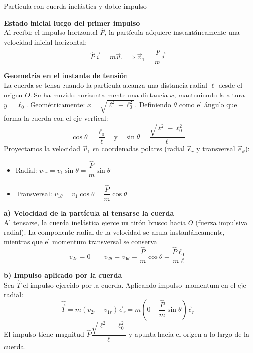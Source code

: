 \begin{solucion}{Partícula con cuerda inelástica y doble impulso}

\textbf{Estado inicial luego del primer impulso}\\
Al recibir el impulso horizontal $\hat{P}$, la partícula adquiere instantáneamente una velocidad inicial horizontal:
$$\hat{P}\,\vec{i} = m\vec{v}_1 \implies \vec{v}_1 = \frac{\hat{P}}{m}\vec{i}$$

\textbf{Geometría en el instante de tensión}\\
La cuerda se tensa cuando la partícula alcanza una distancia radial $\ell$ desde el origen $O$. Se ha movido horizontalmente una distancia $x$, manteniendo la altura $y = \ell_0$. Geométricamente: $x = \sqrt{\ell^2 - \ell_0^2}$. Definiendo $\theta$ como el ángulo que forma la cuerda con el eje vertical:
$$\cos\theta = \frac{\ell_0}{\ell} \quad \text{y} \quad \sin\theta = \frac{\sqrt{\ell^2 - \ell_0^2}}{\ell}$$
Proyectamos la velocidad $\vec{v}_1$ en coordenadas polares (radial $\vec{e}_r$ y transversal $\vec{e}_\theta$):
\begin{itemize}
    \item Radial: $v_{1r} = v_1 \sin\theta = \dfrac{\hat{P}}{m} \sin\theta$
    \item Transversal: $v_{1\theta} = v_1 \cos\theta = \dfrac{\hat{P}}{m} \cos\theta$
\end{itemize}

\textbf{a) Velocidad de la partícula al tensarse la cuerda}\\
Al tensarse, la cuerda inelástica ejerce un tirón brusco hacia $O$ (fuerza impulsiva radial). La componente radial de la velocidad se anula instantáneamente, mientras que el momentum transversal se conserva:
$$v_{2r} = 0 \qquad v_{2\theta} = v_{1\theta} = \frac{\hat{P}}{m} \cos\theta = \frac{\hat{P}\ell_0}{m\ell}$$


\textbf{b) Impulso aplicado por la cuerda}\\
Sea $\hat{T}$ el impulso ejercido por la cuerda. Aplicando impulso--momentum en el eje radial:
$$\hat{\vec{T}} = m(v_{2r} - v_{1r})\vec{e}_r = m\left(0 - \frac{\hat{P}}{m}\sin\theta\right)\vec{e}_r$$
El impulso tiene magnitud $\hat{P} \dfrac{\sqrt{\ell^2 - \ell_0^2}}{\ell}$ y apunta hacia el origen a lo largo de la cuerda.

\end{solucion}
